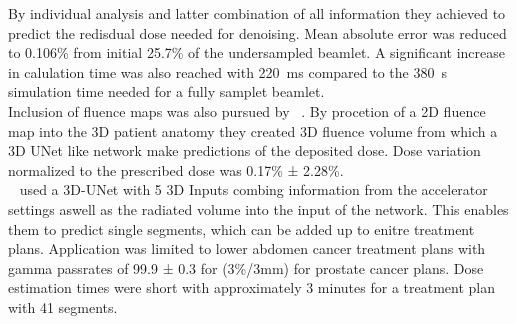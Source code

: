 By individual analysis and latter combination of all information they achieved to predict the redisdual dose needed for denoising.
Mean absolute error was reduced to 0.106\% from initial 25.7\% of the undersampled beamlet.
A significant increase in calulation time was also reached with 220~ms compared to the 380~s simulation time needed for a fully samplet beamlet.\\
Inclusion of fluence maps was also pursued by \citeauthor{fan_data-driven_2020}~\cite{fan_data-driven_2020}. By procetion of a 2D fluence map into the 3D patient anatomy they created 3D fluence volume from which a 3D UNet like network make predictions of the deposited dose.
Dose variation normalized to the prescribed dose was 0.17\% ± 2.28\%.\\
\citeauthor{kontaxis_deepdose_2020}~\cite{kontaxis_deepdose_2020} used a 3D-UNet with 5 3D Inputs combing information from the accelerator settings aswell as the radiated volume into the input of the network.
This enables them to predict single segments, which can be added up to enitre treatment plans.
Application was limited to lower abdomen cancer treatment plans with gamma passrates of 99.9 ± 0.3 for (3\%/3mm) for prostate cancer plans.
Dose estimation times were short with approximately 3 minutes for a treatment plan with 41 segments.